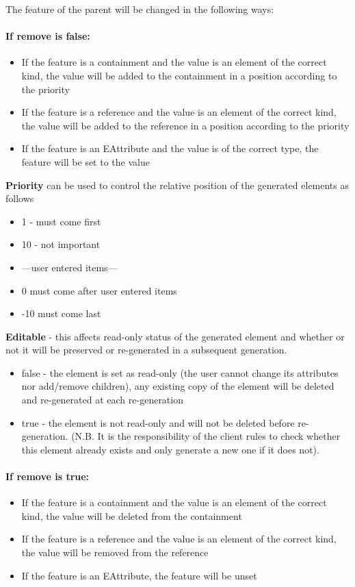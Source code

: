 The feature of the parent will be changed in the following ways:

\paragraph{If remove is false:}
\begin{itemize}
	\item  If the feature is a containment and the value is an element of the correct kind, the value will be added to the containment in a position according to the priority
	\item  If the feature is a reference and the value is an element of the correct kind, the value will be added to the reference in a position according to the priority
	\item  If the feature is an EAttribute and the value is of the correct type, the feature will be set to the value
\end{itemize}

\textbf{Priority} can be used to control the relative position of the generated elements as follows
\begin{itemize}
	\item 1 - must come first
	\item 10 - not important
	\item ---user entered items---
	\item 0 must come after user entered items
	\item -10 must come last
\end{itemize}

\textbf{Editable} - this affects read-only status of the generated element and whether or not it will be preserved or re-generated in a subsequent generation.
\begin{itemize}
	\item  false - the element is set as read-only (the user cannot change its attributes nor add/remove children), any existing copy of the element will be deleted and re-generated at each re-generation
	\item  true  - the element is not read-only and will not be deleted before re-generation. (N.B. It is the responsibility of the client rules to check whether this element already exists and only generate a new one if it does not).
\end{itemize}

\paragraph{If remove is true:}
\begin{itemize}
	\item If the feature is a containment and the value is an element of the correct kind, the value will be deleted from the containment
	\item If the feature is a reference and the value is an element of the correct kind, the value will be removed from the reference
	\item If the feature is an EAttribute, the feature will be unset 
\end{itemize}

